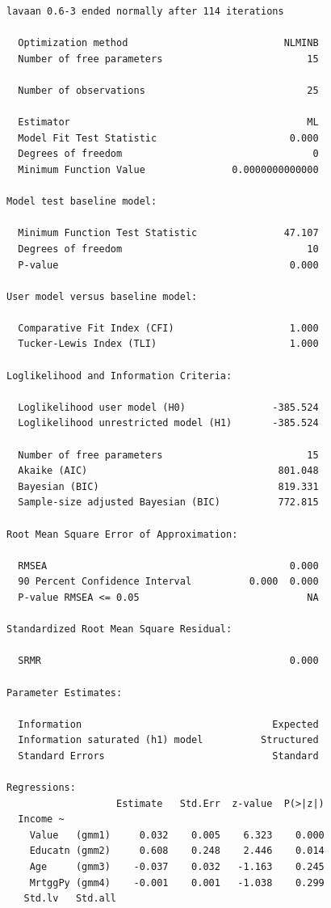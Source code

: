 \begin{verbatim}
lavaan 0.6-3 ended normally after 114 iterations

  Optimization method                           NLMINB
  Number of free parameters                         15

  Number of observations                            25

  Estimator                                         ML
  Model Fit Test Statistic                       0.000
  Degrees of freedom                                 0
  Minimum Function Value               0.0000000000000

Model test baseline model:

  Minimum Function Test Statistic               47.107
  Degrees of freedom                                10
  P-value                                        0.000

User model versus baseline model:

  Comparative Fit Index (CFI)                    1.000
  Tucker-Lewis Index (TLI)                       1.000

Loglikelihood and Information Criteria:

  Loglikelihood user model (H0)               -385.524
  Loglikelihood unrestricted model (H1)       -385.524

  Number of free parameters                         15
  Akaike (AIC)                                 801.048
  Bayesian (BIC)                               819.331
  Sample-size adjusted Bayesian (BIC)          772.815

Root Mean Square Error of Approximation:

  RMSEA                                          0.000
  90 Percent Confidence Interval          0.000  0.000
  P-value RMSEA <= 0.05                             NA

Standardized Root Mean Square Residual:

  SRMR                                           0.000

Parameter Estimates:

  Information                                 Expected
  Information saturated (h1) model          Structured
  Standard Errors                             Standard

Regressions:
                   Estimate   Std.Err  z-value  P(>|z|)
  Income ~                                             
    Value   (gmm1)     0.032    0.005    6.323    0.000
    Educatn (gmm2)     0.608    0.248    2.446    0.014
    Age     (gmm3)    -0.037    0.032   -1.163    0.245
    MrtggPy (gmm4)    -0.001    0.001   -1.038    0.299
   Std.lv   Std.all
                   

\end{verbatim}
